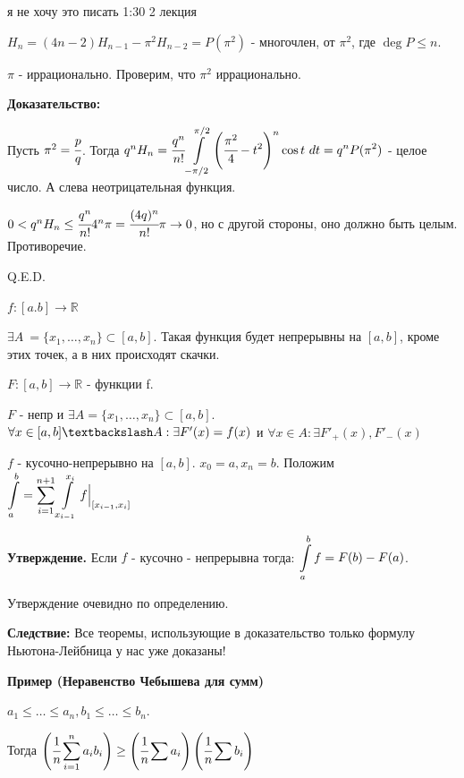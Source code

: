 я не хочу это писать 1:30 2 лекция

$H_n = (4n-2)H_{n-1} - \pi^2H_{n-2} = P(\pi^2)$ - многочлен, от $\pi^2$, где $\deg P\leq n$.


$\pi$ - иррационально. Проверим, что $\pi^2$ иррационально. 

\textbf{Доказательство:}

Пусть $\pi^2 = \cfrac{p}{q}$. Тогда $q^nH_n=\cfrac{q^n}{n!}\displaystyle\int\limits_{-\pi/2}^{\pi/2}\left(\cfrac{\pi^2}{4}-t^2\right)^n \cos t \,\, dt = q^n P(\pi^2)$ - целое число. А слева неотрицательная функция.

$0<q^nH_n \leq \cfrac{q^n}{n!}4^n\pi=\cfrac{(4q)^n}{n!}\pi\rightarrow 0$, но с другой стороны, оно должно быть целым. Противоречие.

\hfill Q.E.D.

 $f:[a.b] \rightarrow \mathbb{R}$ 

$\exists A \ = \{x_1,\ldots,x_n\} \subset [a,b]$. Такая функция будет непрерывны на $[a,b]$, кроме этих точек, а в них происходят скачки.


 $F:[a,b] \rightarrow \mathbb{R}$ -  функции f.

$F$ - непр и $\exists A = \{x_1,\ldots,x_n\} \subset[a,b]$.
$\forall x \in [a,b] \textbackslash A: \exists F'(x) = f(x)$ и $\forall x \in A: \exists F'_+(x),F'_-(x)$


$f$ - кусочно-непрерывно на $[a,b]$. $x_0 = a, x_n = b$. Положим $\displaystyle\int\limits_{a}^{b} = \sum\limits_{i=1}^{n+1}\displaystyle\int\limits_{x_{i-1}}^{x_i}f\Big|_{[x_{i-1},x_i]}$

\textbf{Утверждение.} Если $f$ - кусочно - непрерывна тогда: $\displaystyle\int\limits_{a}^{b}f=F(b)-F(a)$.

Утверждение очевидно по определению.

\textbf{Следствие:} Все теоремы, использующие в доказательство только формулу Ньютона-Лейбница у нас уже доказаны!

\textbf{Пример (Неравенство Чебышева для сумм)}

$a_1\leq \ldots \leq a_n, b_1\leq \ldots \leq b_n$.

Тогда $\displaystyle\left(\cfrac{1}{n} \sum\limits_{i=1}^na_ib_i\right)\geq \left( \cfrac{1}{n}\sum a_i\right)\left(\cfrac{1}{n}\sum b_i\right)$


